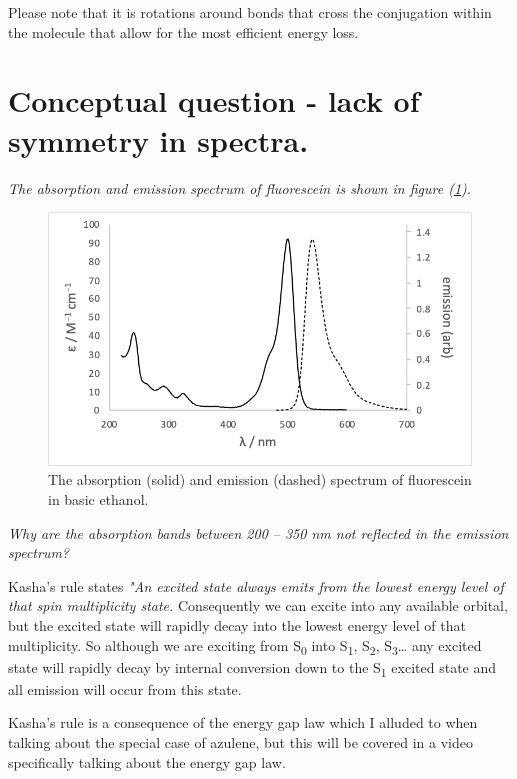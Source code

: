 \documentclass[
]{book}
\begin{document}
Please note that it is rotations around bonds that cross the conjugation within the molecule that allow for the most efficient energy loss.

\hypertarget{conceptual-question---lack-of-symmetry-in-spectra.}{%
\section{Conceptual question - lack of symmetry in spectra.}\label{conceptual-question---lack-of-symmetry-in-spectra.}}

\emph{The absorption and emission spectrum of fluorescein is shown in figure (\ref{fig:fluoresceinspec}).}

\begin{figure}

{\centering \includegraphics[width=0.7\linewidth]{images/fluoresceinspec} 

}

\caption{The absorption (solid) and emission (dashed) spectrum of fluorescein in basic ethanol.}\label{fig:fluoresceinspec}
\end{figure}

\emph{Why are the absorption bands between 200 -- 350 nm not reflected in the emission spectrum?}

Kasha's rule states \emph{"An excited state always emits from the lowest energy level of that spin multiplicity state.} Consequently we can excite into any available orbital, but the excited state will rapidly decay into the lowest energy level of that multiplicity. So although we are exciting from S\textsubscript{0} into S\textsubscript{1}, S\textsubscript{2}, S\textsubscript{3}\ldots{} any excited state will rapidly decay by internal conversion down to the S\textsubscript{1} excited state and all emission will occur from this state.

Kasha's rule is a consequence of the energy gap law which I alluded to when talking about the special case of azulene, but this will be covered in a video specifically talking about the energy gap law.
\end{document}
